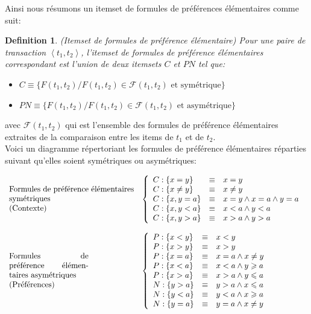 \documentclass[a4paper,12pt,openany,oneside]{article}
\newtheorem{defn}{Definition} %
\begin{document}
Ainsi nous résumons un itemset de formules de préférences élémentaires comme suit:
\begin{defn}(Itemset de formules de préférence élémentaire)
Pour une paire de transaction $\left<t_1,t_2\right>$, l'itemset de formules de préférence élémentaires correspondant est l'union de deux itemsets $C$ et $PN$ tel que:\\ 
\begin{itemize}
	\item	$C\equiv\{F(t_1,t_2)/F(t_1,t_2)\in \mathcal{F}(t_1,t_2)\text{ et  symétrique}\}$
	\item	$PN\equiv\{F(t_1,t_2)/F(t_1,t_2)\in \mathcal{F}(t_1,t_2)\text{ et  asymétrique}\}$
\end{itemize}
\end{defn}
avec $\mathcal{F}(t_1,t_2)$ qui est l'ensemble des formules de préférence élémentaires extraites de la comparaison entre les items de $t_1$ et de $t_2$.\\

Voici un diagramme répertoriant les formules de préférence élémentaires réparties suivant qu'elles soient symétriques ou asymétriques:


 
       \[
       \begin{array}{l l}
       \parbox{5.5cm}{Formules de préférence élémentaires symétriques\\ (Contexte)}&
 	  \left\{
 		  \begin{array}{l c l}
 		     C:\{x=y\}&\equiv& x=y\\
 		     C:\{x\neq y\}&\equiv& x\neq y\\
 		   	 C:\{x,y=a\}&\equiv& x=y\wedge x=a\wedge y=a\\
 		   	 C:\{x,y<a\}&\equiv& x<a\wedge y<a\\
 		   	 C:\{x,y>a\}&\equiv& x>a\wedge y>a
 	   	 \end{array}
    	 \right.\\
 	&\\
       \parbox{3.5cm}{Formules de préférence élémentaires asymétriques\\ (Préférences)}&
 	  \left\{
 		  \begin{array}{l c l}   	 
 		   	 P:\{x<y\}&\equiv& x<y\\
 		   	 P:\{x>y\}&\equiv& x>y\\
 		   	 P:\{x=a\} &\equiv& x=a \wedge x\neq y \\
 		   	 P:\{x<a\} &\equiv& x<a \wedge y\geqslant a\\
 			 P:\{x>a\} &\equiv& x>a \wedge y\leqslant a\\
 			 
 			 N:\{y>a\} &\equiv& y>a \wedge x\leqslant a\\
 			 N:\{y<a\} &\equiv& y<a \wedge x\geqslant a\\
 		   	 N:\{y=a\} &\equiv& y=a \wedge x\neq y\\	 
 	   	 \end{array}
    	 \right.
    	 \end{array}
    	 \]		  
\end{document}

